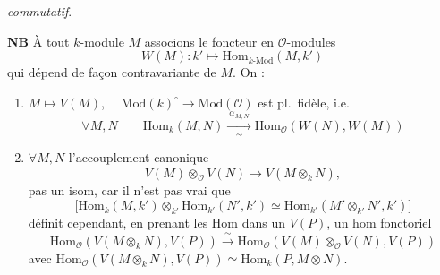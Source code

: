 \documentclass[11pt,a4paper]{article}
\begin{document}
\emph{commutatif}.


\textbf{NB} À tout $k$-module $M$ associons le foncteur en $\mathcal{O}$-modules
\[
  W(M) : k' \longmapsto \mathrm{Hom}_{k\text{-}\mathrm{Mod}}(M, k')
\]
qui dépend de façon contravariante de $M$. On  :
\begin{enumerate}
  \item[a)] $M \mapsto V(M)$, $\quad \mathrm{Mod}(k)^{\circ} \longrightarrow \mathrm{Mod}(\mathcal{O})$ est pl.\ fidèle, i.e.
  \[
    \forall M, N \qquad \mathrm{Hom}_k(M, N) \xrightarrow[\sim]{\ \alpha_{M,N}\ } \mathrm{Hom}_{\mathcal{O}}(W(N), W(M))
  \]
  \struck{\ill{}}
  \item[b)] $\forall M, N$ \struck{\ill{}} l'accouplement canonique
  \[
    V(M) \otimes_{\mathcal{O}} V(N) \longrightarrow V(M \otimes_k N) ,
  \]
  \ill{} pas un isom, car il n'est pas vrai que
  \[
    \bigl[\mathrm{Hom}_k(M, k') \otimes_{k'} \mathrm{Hom}_{k'}(N', k') \simeq \mathrm{Hom}_{k'}(M' \otimes_{k'} N', k')\bigr]
  \]
  définit cependant, en prenant les Hom dans \ill{} un $V(P)$, un hom fonctoriel
  \[
    \mathrm{Hom}_{\mathcal{O}}(V(M \otimes_k N), V(P)) \xrightarrow{\ \sim\ } \mathrm{Hom}_{\mathcal{O}}(V(M) \otimes_{\mathcal{O}} V(N), V(P))
  \]
  avec $\mathrm{Hom}_{\mathcal{O}}(V(M\otimes_k N), V(P)) \simeq \mathrm{Hom}_k(P, M \otimes N)$.
\end{enumerate}
\end{document}
